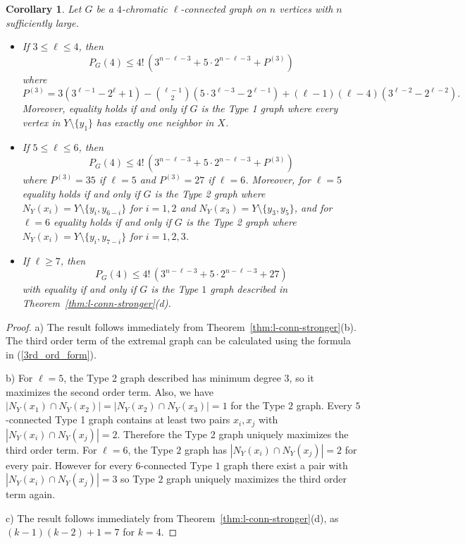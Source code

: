 \documentclass[11pt]{article}
\theoremstyle{plain}
\newtheorem{corollary}[theorem]{Corollary}
\theoremstyle{definition}
\theoremstyle{remark}
\begin{document}
\begin{corollary}\label{cor-k=4}
Let $G$ be a $4$-chromatic $\ell$-connected graph on $n$ vertices with $n$ sufficiently large.
\begin{itemize}
    \item [a)] If $3\leq \ell \leq 4$, then
        \[P_G(4)\leq 4!\,(3^{n-\ell -3}+5\cdot 2^{n-\ell -3}+P^{(3)})\]
        where $P^{(3)}=3(3^{\ell -1}-2^{\ell}+1)-{\ell -1 \choose 2}(5\cdot 3^{\ell -3}-2^{\ell -1})+(\ell -1)(\ell-4)(3^{\ell -2}-2^{\ell -2}).$
    Moreover, equality holds if and only if $G$ is the Type 1 graph where every vertex in $Y\setminus \{y_1\}$ has exactly one neighbor in $X$.
    \item[b)] If $5\leq \ell \leq 6$, then
    \[P_G(4)\leq 4!\,(3^{n-\ell -3}+5\cdot 2^{n-\ell -3}+P^{(3)})\]
        where $P^{(3)}=35$ if $\ell =5$ and $P^{(3)}=27$ if $\ell =6$. Moreover, for $\ell =5$ equality holds if and only if $G$ is the Type 2 graph where $N_Y(x_i)=Y\setminus \{y_i, y_{6-i}\}$ for $i=1,2$ and $N_Y(x_3)=Y\setminus \{y_3, y_5\}$, and for $\ell =6$ equality holds if and only if $G$ is the Type 2 graph where $N_Y(x_i)=Y\setminus \{y_i, y_{7-i}\}$ for $i=1,2,3$.
     \item [c)] If $\ell \geq 7$, then
    \[P_G(4)\leq 4!\,(3^{n-\ell -3}+5\cdot 2^{n-\ell -3}+27) \]
    with equality if and only if  $G$ is the Type $1$ graph described in Theorem~\ref{thm:l-conn-stronger}(d).
    \end{itemize}
\end{corollary}
\begin{proof}
a) The result follows immediately from Theorem~\ref{thm:l-conn-stronger}(b). The third order term of the extremal graph can be calculated using the formula in (\ref{3rd_ord_form}).

b) For $\ell =5$, the Type 2 graph described has minimum degree $3$, so it maximizes the second order term. Also,   we have $|N_Y(x_1)\cap N_Y(x_2)|=|N_Y(x_2)\cap N_Y(x_3)|=1$ for the Type $2$ graph. Every $5$-connected Type 1 graph contains at least two pairs $x_i,x_j$ with $|N_Y(x_i)\cap N_Y(x_j)|=2$. Therefore the Type 2 graph uniquely maximizes the third order term. For $\ell =6$, the Type $2$ graph has $|N_Y(x_i)\cap N_Y(x_j)|=2$ for every pair. However for every $6$-connected Type $1$ graph there exist a pair with $|N_Y(x_i)\cap N_Y(x_j)|=3$ so Type $2$ graph uniquely maximizes the third order term again.

c) The result follows immediately from Theorem~\ref{thm:l-conn-stronger}(d), as $(k-1)(k-2)+1=7$ for $k=4$.
\end{proof}
\end{document}
